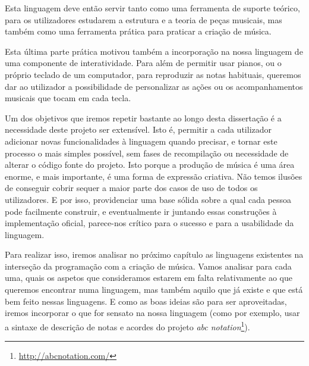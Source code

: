 Esta linguagem deve então servir tanto como uma ferramenta de suporte teórico, para os utilizadores estudarem a estrutura e a teoria de peças musicais, mas também como uma ferramenta prática para praticar a criação de música.

Esta última parte prática motivou também a incorporação na nossa linguagem de uma componente de interatividade. Para além de permitir usar pianos, ou o próprio teclado de um computador, para reproduzir as notas habituais, queremos dar ao utilizador a possibilidade de personalizar as ações ou os acompanhamentos musicais que tocam em cada tecla.

Um dos objetivos que iremos repetir bastante ao longo desta dissertação é a necessidade deste projeto ser extensível. Isto é, permitir a cada utilizador adicionar novas funcionalidades à linguagem quando precisar, e tornar este processo o mais simples possível, sem fases de recompilação ou necessidade de alterar o código fonte do projeto. Isto porque a produção de música é uma área enorme, e mais importante, é uma forma de expressão criativa. Não temos ilusões de conseguir cobrir sequer a maior parte dos casos de uso de todos os utilizadores. E por isso, providenciar uma base sólida sobre a qual cada pessoa pode facilmente construir, e eventualmente ir juntando essas construções à implementação oficial, parece-nos crítico para o sucesso e para a usabilidade da linguagem.

Para realizar isso, iremos analisar no próximo capítulo as linguagens existentes na interseção da programação com a criação de música. Vamos analisar para cada uma, quais os aspetos que consideramos estarem em falta relativamente ao que queremos encontrar numa linguagem, mas também aquilo que já existe e que está bem feito nessas linguagens. E como as boas ideias são para ser aproveitadas, iremos incorporar o que for sensato na nossa linguagem (como por exemplo, usar a sintaxe de descrição de notas e acordes do projeto \textit{abc notation}\footnote{\url{http://abcnotation.com/}}).




